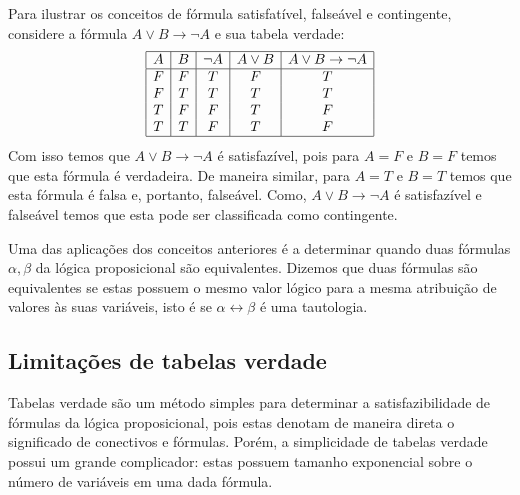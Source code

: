 \begin{Example}
Para ilustrar os conceitos de f\'ormula satisfat\'ivel, false\'avel e
contingente, considere a f\'ormula $A \lor B \to \neg A$ e sua tabela
verdade:
\[
\begin{array}{|c|c|c|c|c|}
  \hline
  A & B & \neg A & A \lor B & A \lor B \to \neg A \\ \hline
  F & F & T & F & T \\
  F & T & T & T & T \\
  T & F & F & T & F \\
  T & T & F & T & F \\ \hline
\end{array}
\]
Com isso temos que $A \lor B \to \neg A$ \'e satisfaz\'ivel, pois para
$A = F$ e $B = F$ temos que esta f\'ormula \'e verdadeira. De maneira
similar, para $A = T$ e $B = T$ temos que esta f\'ormula \'e falsa e,
portanto, false\'avel. Como, $A \lor B \to \neg A$ \'e satisfaz\'ivel
e false\'avel temos que esta pode ser classificada como contingente.
\end{Example}

Uma das aplica\c{c}\~oes dos conceitos anteriores \'e a determinar
quando duas f\'ormulas $\alpha,\beta$ da l\'ogica proposicional s\~ao
equivalentes. Dizemos que duas f\'ormulas s\~ao equivalentes se estas
possuem o mesmo valor l\'ogico para a mesma atribui\c{c}\~ao de
valores \`as suas vari\'aveis, isto \'e se $\alpha \leftrightarrow
\beta$ \'e uma tautologia.

\subsection{Limita\c{c}\~oes de tabelas verdade}\label{limitacao-tabela-verdade}

Tabelas verdade s\~ao um m\'etodo simples para determinar a
satisfazibilidade de f\'ormulas da l\'ogica proposicional, pois estas
denotam de maneira direta o significado de conectivos e
f\'ormulas. Por\'em, a simplicidade de tabelas verdade possui um
grande complicador: estas possuem tamanho exponencial sobre o n\'umero
de vari\'aveis em uma dada f\'ormula.

